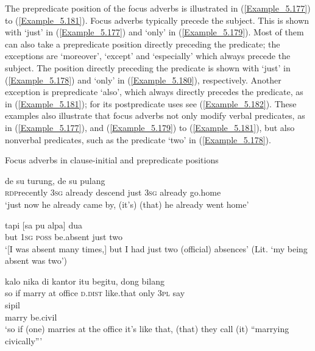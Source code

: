The prepredicate position of the focus adverbs is illustrated in (\ref{Example_5.177}) to (\ref{Example_5.181}). Focus adverbs typically precede the subject. This is shown with  ‘just’ in (\ref{Example_5.177}) and  ‘only’ in (\ref{Example_5.179}). Most of them can also take a prepredicate position directly preceding the predicate; the exceptions are  ‘moreover’,  ‘except’ and  ‘especially’ which always precede the subject. The position directly preceding the predicate is shown with  ‘just’ in (\ref{Example_5.178}) and  ‘only’ in (\ref{Example_5.180}), respectively. Another exception is prepredicate  ‘also’, which always directly precedes the predicate, as in (\ref{Example_5.181}); for its postpredi\-cate uses see (\ref{Example_5.182}). These examples also illustrate that focus adverbs not only modify verbal predicates, as in (\ref{Example_5.177}), and (\ref{Example_5.179}) to (\ref{Example_5.181}), but also nonverbal predicates, such as the  predicate  ‘two’ in (\ref{Example_5.178}).


\begin{styleExampleTitle}
Focus adverbs in clause-initial and prepredicate positions
\end{styleExampleTitle}

\ea
\label{Example_5.177}
 {de} {su} {turung,} {} {de} {su} {pulang}\\ %
 \textsc{rdp}{\Tilde}recently  \textsc{3sg}  already  descend  just  \textsc{3sg}  already  go.home\\
 ‘just now he already came by, (it’s)  (that) he already went home’ \textstyleExampleSource{[080922-001a-CvPh.0554]}
\z

\ea
\label{Example_5.178}
\gll {{\ldots}} {tapi} {[sa} {pu} {alpa]} {} {dua}\\ %
 { }  but  \textsc{1sg}  \textsc{poss}  be.absent  just  two\\
 ‘[I was absent many times,] but I had just two (official) absences’ (Lit. ‘my being absent was  two’) \textstyleExampleSource{[081023-004-Cv.0014]}
\z

\ea
\label{Example_5.179}
 {{kalo}} {nika} {di} {kantor} {itu} {begitu,} {} {dong} {bilang}\\ %
 so  {if}  marry  at  office  \textsc{d.dist}  like.that  only  \textsc{3pl}  say\\
   {sipil}\\
 {marry}  {be.civil}\\
 ‘so if (one) marries at the office it’s like that,  (that) they call (it) ``marrying civically''' \textstyleExampleSource{[081110-007-CvPr.0030]}
\z

